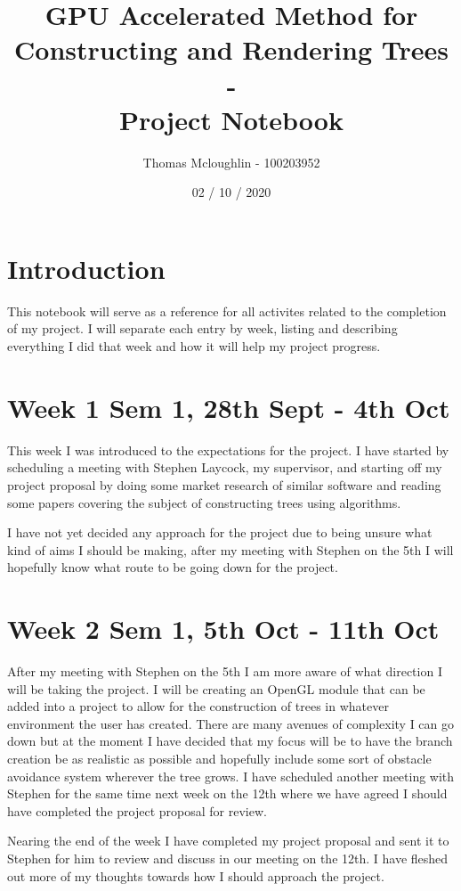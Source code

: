\documentclass[11pt]{article}
\title{GPU Accelerated Method for Constructing and Rendering Trees 
        \\ - \\ 
        Project Notebook}
\author{Thomas Mcloughlin - 100203952}
\date{02 / 10 / 2020}
\begin{document}
\maketitle

\pagebreak
\section*{Introduction}
This notebook will serve as a reference for all activites related to the completion
of my project. I will separate each entry by week, listing and describing everything
I did that week and how it will help my project progress.

\section*{Week 1 Sem 1, 28th Sept - 4th Oct}
This week I was introduced to the expectations for the project. I have started by 
scheduling a meeting with Stephen Laycock, my supervisor, and starting off my project 
proposal by doing some market research of similar software and reading some papers 
covering the subject of constructing trees using algorithms.

I have not yet decided any approach for the project due to being unsure what kind of 
aims I should be making, after my meeting with Stephen on the 5th I will hopefully 
know what route to be going down for the project.

\section*{Week 2 Sem 1, 5th Oct - 11th Oct}
After my meeting with Stephen on the 5th I am more aware of what direction I will be 
taking the project. I will be creating an OpenGL module that can be added into a 
project to allow for the construction of trees in whatever environment the user has 
created. There are many avenues of complexity I can go down but at the moment I have 
decided that my focus will be to have the branch creation be as realistic as possible 
and hopefully include some sort of obstacle avoidance system wherever the tree grows.
I have scheduled another meeting with Stephen for the same time next week on the 12th 
where we have agreed I should have completed the project proposal for review.

Nearing the end of the week I have completed my project proposal and sent it to 
Stephen for him to review and discuss in our meeting on the 12th. I have fleshed out 
more of my thoughts towards how I should approach the project.
\end{document}
